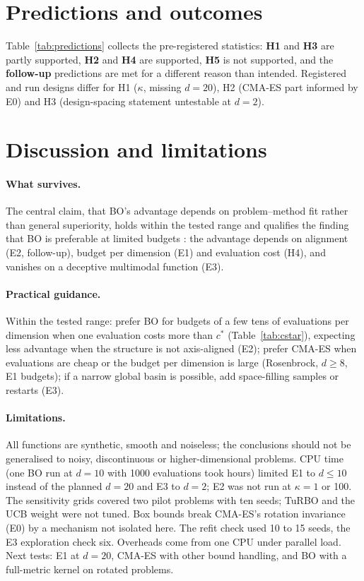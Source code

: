 \documentclass[10pt,a4paper,twocolumn]{article}
\begin{document}
\section{Predictions and outcomes}
Table~\ref{tab:predictions} collects the pre-registered statistics: \textbf{H1} and \textbf{H3} are partly supported,
\textbf{H2} and \textbf{H4} are supported, \textbf{H5} is not supported, and the \textbf{follow-up} predictions are met
for a different reason than intended. Registered and run designs differ for H1 ($\kappa$, missing $d=20$), H2 (CMA-ES
part informed by E0) and H3 (design-spacing statement untestable at $d=2$).

\section{Discussion and limitations}
\paragraph{What survives.}
The central claim, that BO's advantage depends on problem--method fit rather than general superiority, holds within the
tested range and qualifies the finding that BO is preferable at limited budgets \citep{santoni2024hdbo}: the advantage
depends on alignment (E2, follow-up), budget per dimension (E1) and evaluation cost (H4), and vanishes on a deceptive
multimodal function (E3).

\paragraph{Practical guidance.}
Within the tested range: prefer BO for budgets of a few tens of evaluations per dimension when one evaluation costs
more than $c^*$ (Table~\ref{tab:cstar}), expecting less advantage when the structure is not axis-aligned (E2); prefer
CMA-ES when evaluations are cheap or the budget per dimension is large (Rosenbrock, $d\geq8$, E1 budgets); if a narrow
global basin is possible, add space-filling samples or restarts (E3).

\paragraph{Limitations.}
All functions are synthetic, smooth and noiseless; the conclusions should not be generalised to noisy, discontinuous or
higher-dimensional problems. CPU time (one BO run at $d=10$ with 1000 evaluations took hours) limited E1 to $d\leq10$
instead of the planned $d=20$ and E3 to $d=2$; E2 was not run at $\kappa=1$ or 100. The sensitivity grids covered two
pilot problems with ten seeds; TuRBO and the UCB weight were not tuned. Box bounds break
CMA-ES's rotation invariance (E0) by a mechanism not isolated here. The refit check used 10 to 15 seeds, the E3
exploration check six. Overheads come from one CPU under parallel load. Next tests: E1 at $d=20$, CMA-ES with other bound
handling, and BO with a full-metric kernel on rotated problems.
\end{document}

